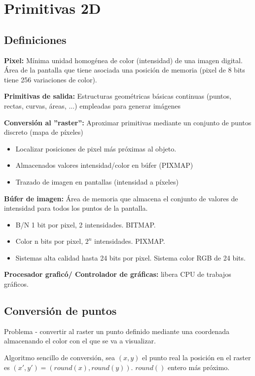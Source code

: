 \chapter{Primitivas 2D}
\section{Definiciones}
\textbf{Pixel:} Mínima unidad homogénea de color (intensidad) de una imagen digital. Área de la pantalla que tiene asociada una posición de memoria (pixel de 8 bits tiene 256 variaciones de color).

\textbf{Primitivas de salida:} Estructuras geométricas básicas continuas (puntos, rectas, curvas, áreas, ...) empleadas para generar imágenes

\textbf{Conversión al ''raster'':} Aproximar primitivas mediante un conjunto de puntos discreto (mapa de píxeles)
\begin{itemize}
    \item Localizar posiciones de pixel más próximas al objeto.
    \item Almacenados valores intensidad/color en búfer (PIXMAP)
    \item Trazado de imagen en pantallas (intensidad a píxeles)
\end{itemize}

\textbf{Búfer de imagen:} Área de memoria que almacena el conjunto de valores de intensidad para todos los puntos de la pantalla.
\begin{itemize}
    \item B/N 1 bit por pixel, 2 intensidades. BITMAP.
    \item Color n bits por pixel, $2^n$ intensidades. PIXMAP.
    \item Sistemas alta calidad hasta 24 bits por pixel. Sistema color RGB de 24 bits.
\end{itemize}

\textbf{Procesador graficó/ Controlador de gráficas:}  libera CPU de trabajos gráficos.

\section{Conversión de puntos}
Problema - convertir al raster un punto definido mediante una coordenada almacenando el color con el que se va a visualizar.

Algoritmo sencillo de conversión, sea $(x, y)$ el punto real la posición en el raster es $(x', y')=(round(x), round(y))$. $round()$ entero más próximo.

